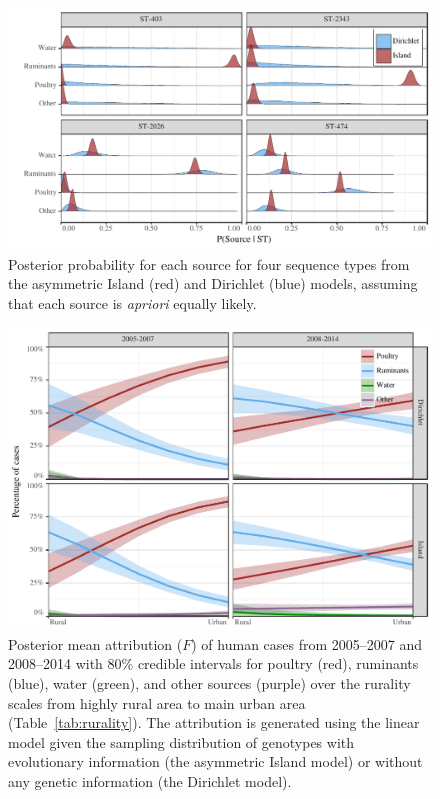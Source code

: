 \documentclass[AMA,STIX1COL]{WileyNJD-v2}
\begin{document}
\begin{figure}
\centering
\includegraphics[width=.9\linewidth]{figures/fig_genotype_dist.pdf}
\caption{Posterior probability for each source for four sequence types from the asymmetric Island (red) and Dirichlet (blue) models, assuming that each source is \emph{apriori} equally likely.}
\label{fig:genotype_dist}
\end{figure}

\begin{figure}
\centering
\includegraphics[width=.9\linewidth]{figures/fig_intervention.pdf}
\caption{Posterior mean attribution ($F$) of human cases from 2005--2007 and 2008--2014 with 80\% credible intervals for poultry (red), ruminants (blue), water (green), and other sources (purple) over the rurality scales from highly rural area to main urban area (Table~\ref{tab:rurality}). The attribution is generated using the linear model given the sampling distribution of genotypes with evolutionary information (the asymmetric Island model) or without any genetic information (the Dirichlet model).}
\label{fig:intervention}
\end{figure}
\end{document}
